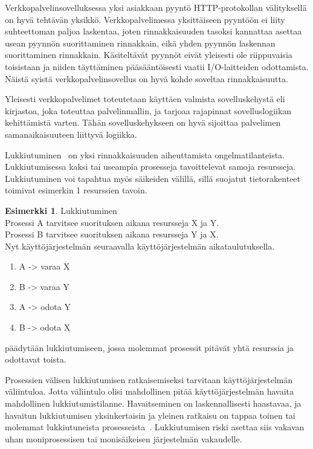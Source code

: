 \documentclass[finnish]{tktltiki2}
\theoremstyle{definition}
\newtheorem{esim}[lau]{Esimerkki}
\theoremstyle{remark}
\begin{document}
Verkkopalvelinsovelluksessa yksi asiakkaan pyyntö HTTP-protokollan välityksellä
on hyvä tehtävän yksikkö. Verkkopalvelimessa yksittäiseen
pyyntöön ei liity suhteettoman paljoa laskentaa, joten
rinnakkaisuuden tasoksi kannattaa asettaa usean pyynnön
suorittaminen rinnakkain, eikä yhden pyynnön laskennan
suorittaminen rinnakkain.
Käsiteltävät pyynnöt eivät yleisesti ole riippuvaisia
toisistaan ja niiden täyttäminen pääsääntöisesti vaatii I/O-laitteiden odottamista.
Näistä syistä verkkopalvelinsovellus on hyvä kohde soveltaa rinnakkaisuutta.

Yleisesti verkkopalvelimet toteutetaan käyttäen valmista sovelluskehystä eli kirjastoa,
joka toteuttaa palvelinmallin, ja tarjoaa rajapinnat sovelluslogiikan
kehittämistä varten. Tähän sovelluskehykseen on hyvä sijoittaa
palvelimen samanaikaisuuteen liittyvä logiikka.

Lukkiutuminen~\cite{stallings_operating_2018}
on yksi rinnakkaisuuden aiheuttamista ongelmatilanteista.
Lukkiutumisessa kaksi tai useampia prosesseja tavoittelevat samoja resursseja.
Lukkiutuminen voi tapahtua myös säikeiden välillä, sillä
suojatut tietorakenteet toimivat esimerkin 1 resurssien tavoin.

\begin{center}
  \begin{esim}
    Lukkiutuminen \\
    Prosessi A tarvitsee suorituksen aikana resursseja X ja Y. \\
    Prosessi B tarvitsee suorituksen aikana resursseja Y ja X. \\
    Nyt käyttöjärjestelmän seuraavalla käyttöjärjestelmän aikataulutuksella.
    \begin{enumerate}
      \item A -> varaa X
      \item B -> varaa Y
      \item A -> odota Y
      \item B -> odota X
    \end{enumerate}
    päädytään lukkiutumiseen, jossa molemmat prosessit
    pitävät yhtä resurssia ja odottavat toista.
  \end{esim}
\end{center}

Prosessien välisen lukkiutumisen ratkaisemiseksi tarvitaan
käyttöjärjestelmän väliintuloa. Jotta väliintulo olisi mahdollinen pitää
käyttöjärjestelmän havaita mahdollinen lukkiutumistilanne.
Havaitseminen on laskennallisesti haastavaa, ja havaitun lukkiutumisen
yksinkertaisin ja yleinen ratkaisu on tappaa toinen
tai molemmat lukkiutuneista prosesseista~\cite{stallings_operating_2018}.
Lukkiutumisen riski asettaa siis vakavan uhan moniprosessisen tai monisäikeisen
järjestelmän vakaudelle.
\end{document}
